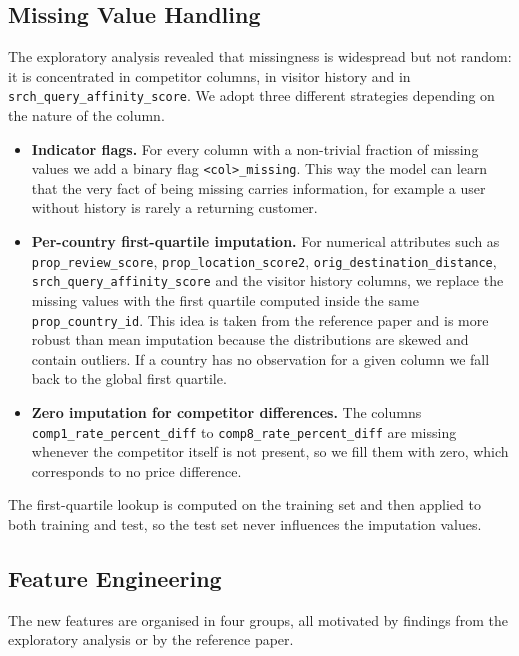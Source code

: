 \documentclass[runningheads]{llncs}
\begin{document}
\subsection{Missing Value Handling}
The exploratory analysis revealed that missingness is widespread but not random: it is concentrated in competitor columns, in visitor history and in \texttt{srch\_query\_affinity\_score}. We adopt three different strategies depending on the nature of the column.

\begin{itemize}
    \item \textbf{Indicator flags.} For every column with a non-trivial fraction of missing values we add a binary flag \texttt{<col>\_missing}. This way the model can learn that the very fact of being missing carries information, for example a user without history is rarely a returning customer.
    \item \textbf{Per-country first-quartile imputation.} For numerical attributes such as \texttt{prop\_review\_score}, \texttt{prop\_location\_score2}, \texttt{orig\_destination\_distance}, \texttt{srch\_query\_affinity\_score} and the visitor history columns, we replace the missing values with the first quartile computed inside the same \texttt{prop\_country\_id}. This idea is taken from the reference paper \cite{DBLP:journals/corr/LiuXZYPLSW13} and is more robust than mean imputation because the distributions are skewed and contain outliers. If a country has no observation for a given column we fall back to the global first quartile.
    \item \textbf{Zero imputation for competitor differences.} The columns \texttt{comp1\_rate\_percent\_diff} to \texttt{comp8\_rate\_percent\_diff} are missing whenever the competitor itself is not present, so we fill them with zero, which corresponds to no price difference.
\end{itemize}

The first-quartile lookup is computed on the training set and then applied to both training and test, so the test set never influences the imputation values.

\subsection{Feature Engineering}
The new features are organised in four groups, all motivated by findings from the exploratory analysis or by the reference paper.
\end{document}
